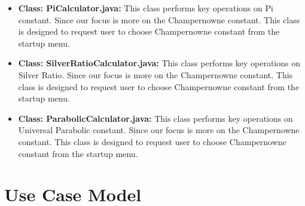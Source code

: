 \documentclass[12pt, a4paper]{report}
\begin{document}
\begin{itemize}
    \item \textbf{Class: PiCalculator.java:} This class performs key operations on Pi constant. Since our focus is more on the Champernowne constant. This class is designed to request user to choose Champernowne constant from the startup menu.
    \item \textbf{Class: SilverRatioCalculator.java:} This class performs key operations on Silver Ratio. Since our focus is more on the Champernowne constant. This class is designed to request user to choose Champernowne constant from the startup menu.
    \item \textbf{Class: ParabolicCalculator.java:} This class performs key operations on Universal Parabolic constant. Since our focus is more on the Champernowne constant. This class is designed to request user to choose Champernowne constant from the startup menu.

\end{itemize}

\chapter{Use Case Model}
\end{document}
